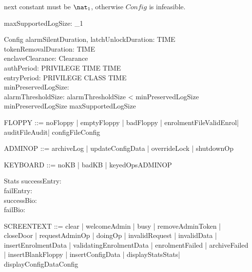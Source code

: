 \begin{zed}
  [Audit]
\end{zed}

\The next constant must be $\nat_1$, otherwise $Config$ is infeasible.
\begin{axdef}
  maxSupportedLogSize: \nat_1
\end{axdef}

\begin{schema}{Config}
  alarmSilentDuration, latchUnlockDuration: TIME\\
  tokenRemovalDuration: TIME\\
  enclaveClearance: Clearance\\
  authPeriod: PRIVILEGE \fun  TIME \fun  \power  TIME\\
  entryPeriod: PRIVILEGE \fun  CLASS \fun  \power  TIME\\
  minPreservedLogSize: \nat \\
  alarmThresholdSize: \nat
\where
  alarmThresholdSize < minPreservedLogSize\\
  minPreservedLogSize \leq  maxSupportedLogSize
\end{schema}

\begin{zed}
FLOPPY ::= noFloppy | emptyFloppy | badFloppy | enrolmentFile\ldata ValidEnrol\rdata | auditFile\ldata \finset  Audit\rdata | configFile\ldata Config\rdata
\end{zed}

\begin{zed}
ADMINOP ::= archiveLog | updateConfigData | overrideLock | shutdownOp
\end{zed}

\begin{zed}
KEYBOARD ::= noKB | badKB | keyedOps\ldata ADMINOP\rdata
\end{zed}

\begin{schema}{Stats}
  successEntry: \nat \\
  failEntry: \nat \\
  successBio: \nat \\
  failBio: \nat
\end{schema}

\begin{zed}
SCREENTEXT ::= clear | welcomeAdmin | busy | removeAdminToken | closeDoor | requestAdminOp | doingOp | invalidRequest | invalidData | insertEnrolmentData | validatingEnrolmentData | enrolmentFailed | archiveFailed | insertBlankFloppy | insertConfigData | displayStats\ldata Stats\rdata | displayConfigData\ldata Config\rdata
\end{zed}

